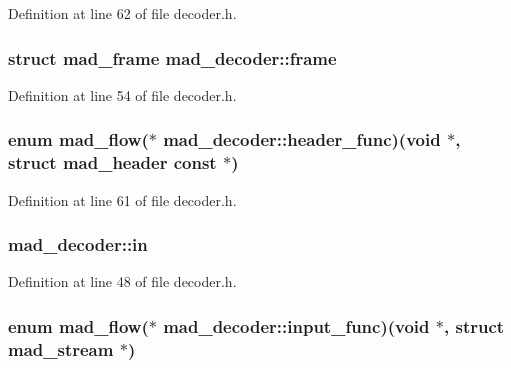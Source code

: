 Definition at line 62 of file decoder.\+h.

\subsubsection[{\texorpdfstring{frame}{frame}}]{\setlength{\rightskip}{0pt plus 5cm}struct {\bf mad\+\_\+frame} mad\+\_\+decoder\+::frame}\hypertarget{structmad__decoder_a35cf3f7b3aaa4336718ff1896808bd70}{}\label{structmad__decoder_a35cf3f7b3aaa4336718ff1896808bd70}


Definition at line 54 of file decoder.\+h.

\subsubsection[{\texorpdfstring{header\+\_\+func}{header_func}}]{\setlength{\rightskip}{0pt plus 5cm}enum {\bf mad\+\_\+flow}($\ast$ mad\+\_\+decoder\+::header\+\_\+func)({\bf void} $\ast$, struct {\bf mad\+\_\+header} {\bf const} $\ast$)}\hypertarget{structmad__decoder_ade30180873067a42e095265390dc1ba4}{}\label{structmad__decoder_ade30180873067a42e095265390dc1ba4}


Definition at line 61 of file decoder.\+h.

\subsubsection[{\texorpdfstring{in}{in}}]{ mad\+\_\+decoder\+::in}\hypertarget{structmad__decoder_aecedf7b9ab4d0dd3c8817dc96c07f28e}{}\label{structmad__decoder_aecedf7b9ab4d0dd3c8817dc96c07f28e}


Definition at line 48 of file decoder.\+h.

\subsubsection[{\texorpdfstring{input\+\_\+func}{input_func}}]{\setlength{\rightskip}{0pt plus 5cm}enum {\bf mad\+\_\+flow}($\ast$ mad\+\_\+decoder\+::input\+\_\+func)({\bf void} $\ast$, struct {\bf mad\+\_\+stream} $\ast$)}\hypertarget{structmad__decoder_a006915bc94cbb087f5a2073a4b49d1bd}{}\label{structmad__decoder_a006915bc94cbb087f5a2073a4b49d1bd}


